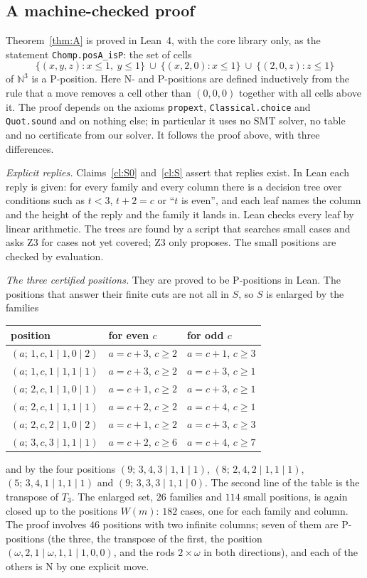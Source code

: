\documentclass[11pt]{amsart}
\theoremstyle{definition}
\theoremstyle{remark}
\newcommand{\w}{\omega}
\begin{document}
\subsection{A machine-checked proof}\label{sec:lean}
Theorem~\ref{thm:A} is proved in Lean~4, with the core library only, as the statement
\texttt{Chomp.posA\_isP}: the set of cells
\[
\{(x,y,z):x\le1,\ y\le1\}\ \cup\ \{(x,2,0):x\le1\}\ \cup\ \{(2,0,z):z\le1\}
\]
of $\mathbb N^3$ is a P-position. Here N- and P-positions are defined inductively from the
rule that a move removes a cell other than $(0,0,0)$ together with all cells above it. The
proof depends on the axioms \texttt{propext}, \texttt{Classical.choice} and
\texttt{Quot.sound} and on nothing else; in particular it uses no SMT solver, no table and no
certificate from our solver. It follows the proof above, with three differences.

\emph{Explicit replies.} Claims~\ref{cl:S0} and~\ref{cl:S} assert that replies exist. In Lean
each reply is given: for every family and every column there is a decision tree over
conditions such as $t<3$, $t+2=c$ or ``$t$ is even'', and each leaf names the column and the
height of the reply and the family it lands in. Lean checks every leaf by linear arithmetic.
The trees are found by a script that searches small cases and asks Z3 for cases not yet
covered; Z3 only proposes. The small positions are checked by evaluation.

\emph{The three certified positions.} They are proved to be P-positions in Lean. The
positions that answer their finite cuts are not all in $S$, so $S$ is enlarged by the
families
\begin{center}
\begin{tabular}{lll}
\toprule
position & for even $c$ & for odd $c$\\
\midrule
$(a;\,1,c,1\mid1,0\mid2)$ & $a=c+3$, $c\ge2$ & $a=c+1$, $c\ge3$\\
$(a;\,1,c,1\mid1,1\mid1)$ & $a=c+3$, $c\ge2$ & $a=c+3$, $c\ge1$\\
$(a;\,2,c,1\mid1,0\mid1)$ & $a=c+1$, $c\ge2$ & $a=c+3$, $c\ge1$\\
$(a;\,2,c,1\mid1,1\mid1)$ & $a=c+2$, $c\ge2$ & $a=c+4$, $c\ge1$\\
$(a;\,2,c,2\mid1,0\mid2)$ & $a=c+1$, $c\ge2$ & $a=c+3$, $c\ge3$\\
$(a;\,3,c,3\mid1,1\mid1)$ & $a=c+2$, $c\ge6$ & $a=c+4$, $c\ge7$\\
\bottomrule
\end{tabular}
\end{center}
and by the four positions $(9;\,3,4,3\mid1,1\mid1)$, $(8;\,2,4,2\mid1,1\mid1)$,
$(5;\,3,4,1\mid1,1\mid1)$ and $(9;\,3,3,3\mid1,1\mid0)$. The second line of the table is the
transpose of $T_3$. The enlarged set, $26$ families and $114$ small positions, is again closed
up to the positions $W(m)$: $182$ cases, one for each family and column. The proof involves
$46$ positions with two infinite columns; seven of them are P-positions
(the three, the transpose of the first, the position $(\w,2,1\mid\w,1,1\mid1,0,0)$, and the rods
$2\times\omega$ in both directions), and each of the others is N by one explicit move.
\end{document}
